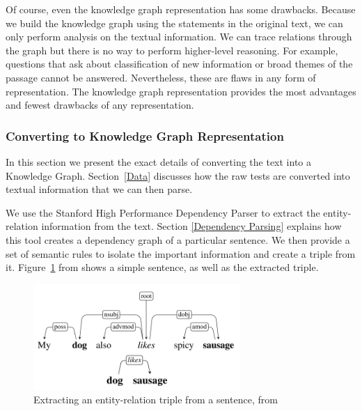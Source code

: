 \documentclass[pageno]{final_paper}
\begin{document}
Of course, even the knowledge graph representation has some drawbacks. Because
we build the knowledge graph using the statements in the original text, we can
only perform analysis on the textual information. We can trace relations through
the graph but there is no way to perform higher-level reasoning. For example,
questions that ask about classification of new information or broad themes of
the passage cannot be answered. Nevertheless, these are flaws in any form of
representation. The knowledge graph representation provides the most advantages
and fewest drawbacks of any representation. \\

\subsubsection{Converting to Knowledge Graph Representation}
\label{Converting to Knowledge Graph Representation}

In this section we present the exact details of converting the text into a
Knowledge Graph. Section~\ref{Data} discusses how the raw tests are converted
into textual information that we can then parse.

We use the Stanford High Performance Dependency Parser \cite{Chen2014} to
extract the entity-relation information from the text. Section \ref{Dependency
Parsing} explains how this tool creates a dependency graph of a particular
sentence. We then provide a set of semantic rules to isolate the important
information and create a triple from it. Figure~\ref{fig: dependency extraction}
from \cite{Narasimhan2015} shows a simple sentence, as well as the extracted
triple.

\begin{figure}[!tb]
    \centering
    \includegraphics[width=0.7\textwidth,keepaspectratio]{figures/Dependency_Extraction.png}
    \caption{Extracting an entity-relation triple from a sentence, from \cite{Narasimhan2015}}
    \label{fig: dependency extraction}
\end{figure}
\end{document}
